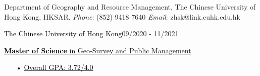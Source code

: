 \documentclass{joel_cv}
\begin{document}
\pagestyle{empty}
\begin{cvHeader} 
	Department of Geography and Resource Management, The Chinese University of Hong Kong, HKSAR.
	\emph{Phone}: (852) 9418 7640 \quad  \emph{Email}: zhsk@link.cuhk.edu.hk

\end{cvHeader}
%
%
%
\begin{sectionContentSimple}{\href{https://www.cuhk.edu.hk/}{\textcolor{black}{The Chinese University of Hong Kong}}}{09/2020 - 11/2021}
	\item   \href{https://zhu-sk.github.io/MSc_Certificate.pdf}{\textcolor{black}{\textbf{Master of Science} in Geo-Survey and Public Management}}
		\begin{itemize}
		\item[•] \href{https://zhu-sk.github.io/MSc_Transcript.pdf}{\textcolor{black}{Overall GPA: 3.72/4.0}}
		\end{itemize}
\end{sectionContentSimple}
\end{document}
